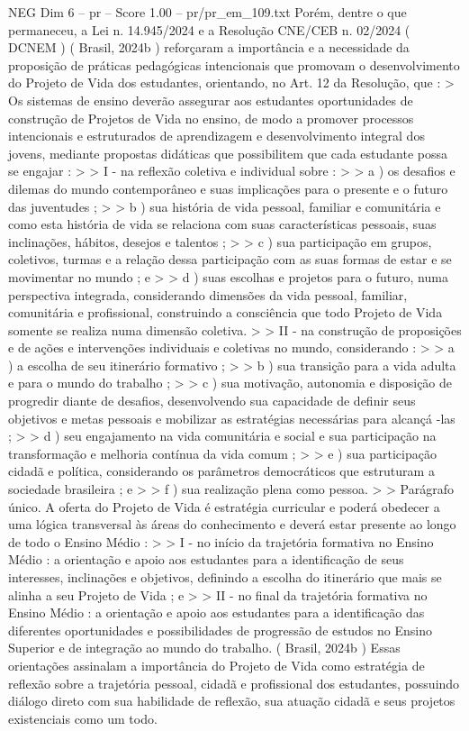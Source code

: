 \begin{textsample}{NEG Dim 6 – pr – Score 1.00 – pr/pr\_em\_109.txt}
Porém, dentre o que permaneceu, a Lei n. 14.945/2024 e a Resolução CNE/CEB n. 02/2024 ( DCNEM ) ( Brasil, 2024b ) reforçaram a importância e a necessidade da proposição de práticas pedagógicas intencionais que promovam o desenvolvimento do Projeto de Vida dos estudantes, orientando, no Art. 12 da Resolução, que : > Os sistemas de ensino deverão assegurar aos estudantes oportunidades de construção de Projetos de Vida no ensino, de modo a promover processos intencionais e estruturados de aprendizagem e desenvolvimento integral dos jovens, mediante propostas didáticas que possibilitem que cada estudante possa se engajar : > > I - na reflexão coletiva e individual sobre : > > a ) os desafios e dilemas do mundo contemporâneo e suas implicações para o presente e o futuro das juventudes ; > > b ) sua história de vida pessoal, familiar e comunitária e como esta história de vida se relaciona com suas características pessoais, suas inclinações, hábitos, desejos e talentos ; > > c ) sua participação em grupos, coletivos, turmas e a relação dessa participação com as suas formas de estar e se movimentar no mundo ; e > > d ) suas escolhas e projetos para o futuro, numa perspectiva integrada, considerando dimensões da vida pessoal, familiar, comunitária e profissional, construindo a consciência que todo Projeto de Vida somente se realiza numa dimensão coletiva. > > II - na construção de proposições e de ações e intervenções individuais e coletivas no mundo, considerando : > > a ) a escolha de seu itinerário formativo ; > > b ) sua transição para a vida adulta e para o mundo do trabalho ; > > c ) sua motivação, autonomia e disposição de progredir diante de desafios, desenvolvendo sua capacidade de definir seus objetivos e metas pessoais e mobilizar as estratégias necessárias para alcançá -las ; > > d ) seu engajamento na vida comunitária e social e sua participação na transformação e melhoria contínua da vida comum ; > > e ) sua participação cidadã e política, considerando os parâmetros democráticos que estruturam a sociedade brasileira ; e > > f ) sua realização plena como pessoa. > > Parágrafo único.
A oferta do Projeto de Vida é estratégia curricular e poderá obedecer a uma lógica transversal às áreas do conhecimento e deverá estar presente ao longo de todo o Ensino Médio : > > I - no início da trajetória formativa no Ensino Médio : a orientação e apoio aos estudantes para a identificação de seus interesses, inclinações e objetivos, definindo a escolha do itinerário que mais se alinha a seu Projeto de Vida ; e > > II - no final da trajetória formativa no Ensino Médio : a orientação e apoio aos estudantes para a identificação das diferentes oportunidades e possibilidades de progressão de estudos no Ensino Superior e de integração ao mundo do trabalho. ( Brasil, 2024b ) Essas orientações assinalam a importância do Projeto de Vida como estratégia de reflexão sobre a trajetória pessoal, cidadã e profissional dos estudantes, possuindo diálogo direto com sua habilidade de reflexão, sua atuação cidadã e seus projetos existenciais como um todo.

\end{textsample}
